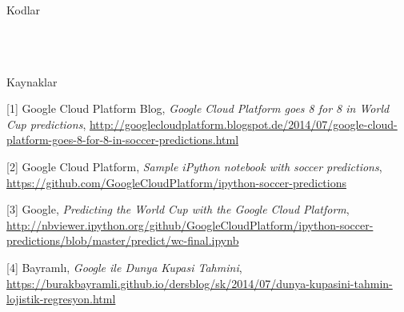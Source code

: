 \documentclass[12pt,fleqn]{article}\usepackage{../../common}
\begin{document}
Kodlar

\inputminted[fontsize=\footnotesize]{python}{world_cup.py}

\inputminted[fontsize=\footnotesize]{python}{power.py}

\inputminted[fontsize=\footnotesize]{python}{features.py}

\inputminted[fontsize=\footnotesize]{python}{match_stats.py}

Kaynaklar

[1] Google Cloud Platform Blog, {\em Google Cloud Platform goes 8 for 8 in World Cup predictions}, \url{http://googlecloudplatform.blogspot.de/2014/07/google-cloud-platform-goes-8-for-8-in-soccer-predictions.html}

[2] Google Cloud Platform, {\em Sample iPython notebook with soccer predictions}, \url{https://github.com/GoogleCloudPlatform/ipython-soccer-predictions}

[3] Google, {\em Predicting the World Cup with the Google Cloud Platform}, \url{http://nbviewer.ipython.org/github/GoogleCloudPlatform/ipython-soccer-predictions/blob/master/predict/wc-final.ipynb}

[4] Bayramlı, 
    {\em Google ile Dunya Kupasi Tahmini}, 
    \url{https://burakbayramli.github.io/dersblog/sk/2014/07/dunya-kupasini-tahmin-lojistik-regresyon.html}
\end{document}
